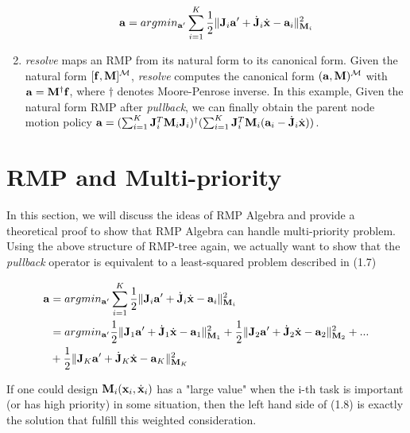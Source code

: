 \begin{enumerate}
\begin{equation}
\mathbf{a} = argmin_{\mathbf{a}'}\sum_{i=1}^{K}\dfrac{1}{2}\|\mathbf{J}_i{\mathbf{a}}'+\dot{\mathbf{J}}_i\dot{\mathbf{x}} - \mathbf{a}_i\|_{\mathbf{M}_i}^2
\end{equation}


\item \textit{resolve} maps an RMP from its natural form to its canonical form. Given the natural form $[\mathbf{f}, \mathbf{M}]^{\mathcal{M}}$, \textit{resolve} computes the canonical form $(\mathbf{a}, \mathbf{M})^{\mathcal{M}}$ with $\mathbf{a} = \mathbf{M}^{\dagger}\mathbf{f}$, where $\dagger$ denotes Moore-Penrose inverse.  
In this example, Given the natural form RMP after \textit{pullback}, we can finally obtain the parent node motion policy $\mathbf{a} = (\sum_{i=1}^{K}\mathbf{J}_i^T\mathbf{M}_i\mathbf{J}_i)^{\dagger}(\sum_{i=1}^{K}\mathbf{J}_i^T\mathbf{M}_i(\mathbf{a}_i-\dot{\mathbf{J}}_i\dot{\mathbf{x}}))$. 
 
\end{enumerate}	




\section{RMP and Multi-priority}
In this section, we will discuss the ideas of RMP Algebra and provide a theoretical proof to show that RMP Algebra can handle multi-priority problem. \\
Using the above structure of RMP-tree again, we actually want to show that the \textit{pullback} operator is equivalent to a least-squared 
	problem described in (1.7) 

\begin{equation}
\begin{aligned}
\mathbf{a} &= argmin_{\mathbf{a}'}\sum_{i=1}^{K}\dfrac{1}{2}\|\mathbf{J}_i{\mathbf{a}}'+\dot{\mathbf{J}}_i\dot{\mathbf{x}} - \mathbf{a}_i\|_{\mathbf{M}_i}^2 \\
&= argmin_{\mathbf{a}'}\dfrac{1}{2}\|\mathbf{J}_1{\mathbf{a}}'+\dot{\mathbf{J}}_1\dot{\mathbf{x}} - \mathbf{a}_1\|_{\mathbf{M}_1}^2 + \dfrac{1}{2}\|\mathbf{J}_2{\mathbf{a}}'+\dot{\mathbf{J}}_2\dot{\mathbf{x}} - \mathbf{a}_2\|_{\mathbf{M}_2}^2 + ... \\
&+ \dfrac{1}{2}\|\mathbf{J}_K{\mathbf{a}}'+\dot{\mathbf{J}}_K\dot{\mathbf{x}} - \mathbf{a}_K\|_{\mathbf{M}_K}^2
\end{aligned}
\end{equation}

If one could design $\mathbf{M}_i(\mathbf{x}_i, \dot{\mathbf{x}}_i)$ has a "large value" when the i-th task is important (or has high priority) in some situation, then the left hand side of (1.8) is exactly the solution that fulfill this weighted consideration.  \\

